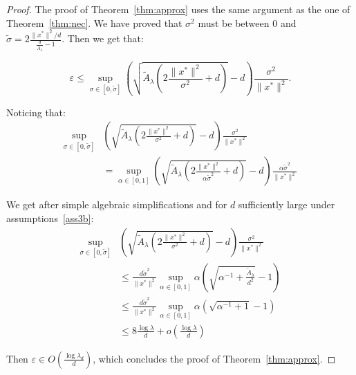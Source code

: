 \begin{proof}

The proof of Theorem~\ref{thm:approx} uses the same argument as the one of Theorem~\ref{thm:nec}. We have proved that $\sigma^2$ must be between $0$ and $\tilde{\sigma}=2\frac{\lVert x^*\rVert^2/d}{\frac{d}{\bar{A}_\lambda}-1}$. Then  we get that:

$$\varepsilon\leq \sup_{\sigma\in\left[0,\tilde{\sigma}\right]}\left( \sqrt{ \tilde{A}_\lambda\left(2\frac{\lVert x^*\rVert^2}{\sigma^2}+d\right)}-d \right)\frac{\sigma^2}{\lVert x^*\rVert^2}.$$

Noticing that: 
\begin{align*}
    \sup_{\sigma\in\left[0,\tilde{\sigma}\right]}&\left( \sqrt{ \tilde{A}_\lambda\left(2\frac{\lVert x^*\rVert^2}{\sigma^2}+d\right)}-d \right)\frac{\sigma^2}{\lVert x^*\rVert^2} \\
    &= \sup_{\alpha\in\left[0,1\right]}\left( \sqrt{ \tilde{A}_\lambda\left(2\frac{\lVert x^*\rVert^2}{\alpha\tilde{\sigma}^2}+d\right)}-d \right)\frac{\alpha\tilde{\sigma}^2}{\lVert x^*\rVert^2}
\end{align*}

We get after simple algebraic simplifications and for $d$ sufficiently large under assumptions~\eqref{ass3b}:
\begin{align*}
     \sup_{\sigma\in\left[0,\tilde{\sigma}\right]}&\left( \sqrt{ \tilde{A}_\lambda\left(2\frac{\lVert x^*\rVert^2}{\sigma^2}+d\right)}-d \right)\frac{\sigma^2}{\lVert x^*\rVert^2}\\
     &\leq\frac{d\tilde{\sigma}^2}{\lVert x^*\rVert^2} \sup_{\alpha\in\left[0,1\right]}\alpha\left(\sqrt{\alpha^{-1}+\frac{\tilde{A}_\lambda}{d^2}}-1\right)\\
     &\leq\frac{d\tilde{\sigma}^2}{\lVert x^*\rVert^2} \sup_{\alpha\in\left[0,1\right]}\alpha\left(\sqrt{\alpha^{-1}+1}-1\right)\\
     &\leq 8\frac{\log\lambda}{d}+o\left(\frac{\log\lambda}{d}\right)
\end{align*}

Then $\varepsilon\in O\left( \frac{\log\lambda_d}{d}\right)$, which concludes the proof of Theorem~\ref{thm:approx}.

\end{proof}

